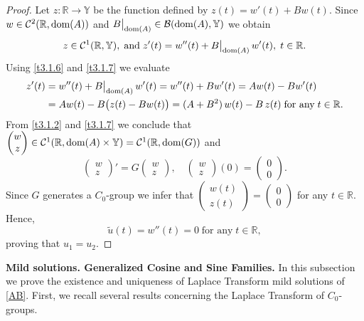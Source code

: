 \documentclass[11pt]{amsart}
\numberwithin{equation}{section}
\newcommand\R{\mathbb R}
\newcommand{\RR}{{\mathbb R}}
\newcommand{\tu}{{\widetilde{u}}}
\theoremstyle{remark}
\theoremstyle{definition}
\newcommand\bY{{\mathbb Y}}
\newcommand{\dom}{\text{\rm{dom}}}
\begin{document}
\begin{proof}
	Let $z : \R \to \bY$ be the function defined by 
	$z(t)=w'(t)+Bw(t)$.
	Since $w \in \mathcal{C}^2(\R, \dom(A))$ and $B\big|_{\dom(A)} \in \mathcal{B}(\dom(A), \bY)$ we obtain 
	\begin{equation}\label{t3.1.7}
		z \in \mathcal{C}^1(\R,\bY),\;\mbox{and}\;
		z'(t) = w''(t) + B\big|_{\dom(A)}\,w'(t),\; t \in \RR.
	\end{equation}
	Using \eqref{t3.1.6} and \eqref{t3.1.7} we evaluate
	\begin{align}\label{t3.1.8}
		z'(t)&= w''(t) + B\big|_{\dom(A)}\,w'(t)= w''(t) + Bw'(t)= Aw(t) - Bw'(t)
		\nonumber\\
		&= Aw(t) - B\bigl(z(t) - Bw(t)\bigr)= (A + B^2)\,w(t) - B\,z(t)\;\text{for any}\;t \in \R.
	\end{align}
	From \eqref{t3.1.2} and \eqref{t3.1.7} we conclude that $\begin{pmatrix}w\\z\end{pmatrix} \in \mathcal{C}^1(\R,\dom(A)\times \bY)
	= \mathcal{C}^1(\R,\dom(G))$ and 
	\begin{equation}\label{t3.1.9}
		\begin{pmatrix}w\\z\end{pmatrix}' = G\begin{pmatrix}w\\z\end{pmatrix},\quad
		\begin{pmatrix}w\\z\end{pmatrix} (0)= \begin{pmatrix}0\\0\end{pmatrix}.
	\end{equation}
	Since $G$ generates a $C_0$-group we infer that
	$\begin{pmatrix}w(t)\\z(t)\end{pmatrix} = \begin{pmatrix}0\\0\end{pmatrix}$
	for any $t \in \R$. Hence,
	\begin{equation}\label{t3.1.10}
		\tu(t) = w''(t) = 0\;\text{for any}\; t \in \R,
	\end{equation}
	proving that $u_1 = u_2$.
\end{proof}	
\noindent\textbf{Mild solutions. Generalized Cosine and Sine Families.}
In this subsection we prove the existence and uniqueness of Laplace Transform mild solutions of \eqref{AB}. First, we recall several results concerning the Laplace Transform of $C_0$-groups. 
\end{document}
